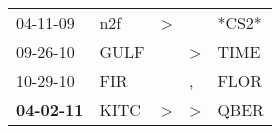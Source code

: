 \begin{supertabular}{p{0.07\textwidth}p{0.06\textwidth}p{0.02\textwidth}p{0.02\textwidth}p{0.06\textwidth}}
          04-11-09\textsuperscript{} &   n2f\textsuperscript{} &  \textgreater &               &                   *CS2* \\
          09-26-10\textsuperscript{} &  GULF\textsuperscript{} &               &  \textgreater &  TIME\textsuperscript{} \\
          10-29-10\textsuperscript{} &   FIR\textsuperscript{} &               &             , &  FLOR\textsuperscript{} \\
 \textbf{04-02-11\textsuperscript{}} &  KITC\textsuperscript{} &  \textgreater &  \textgreater &  QBER\textsuperscript{} \\
\end{supertabular}
